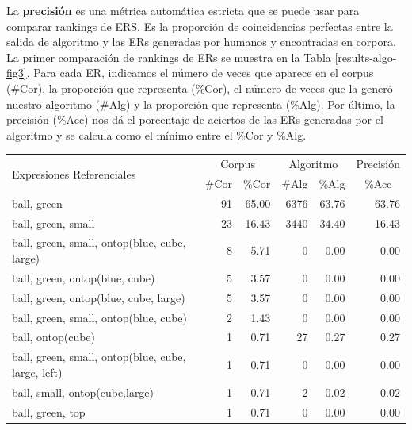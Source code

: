 \begin{table}[H]
La \textbf{precisi\'on}  es una m\'etrica autom\'atica estricta que se puede usar para comparar rankings de ERS. Es la proporci\'on de coincidencias perfectas entre la salida de algoritmo y las ERs generadas por humanos y encontradas en corpora. 
La primer comparaci\'on de rankings de ERs se muestra en la Tabla \ref{results-algo-fig3}. Para cada ER, indicamos el n\'umero de veces que aparece en el corpus (\#Cor), la proporci\'on que representa (\%Cor), el n\'umero de veces que la gener\'o nuestro algoritmo (\#Alg) y la proporci\'on que representa (\%Alg).
Por \'ultimo, la precisi\'on (\%Acc) nos d\'a el porcentaje de aciertos de las ERs generadas por el algoritmo y se calcula como el m\'inimo entre el \%Cor y \%Alg. 

\begin{table}[H]
\begin{small}
\begin{center}
\begin{tabular}{|l|r|r|r|r|r|}
\hline
\multirow{2}{*}{Expresiones Referenciales} & \multicolumn{2}{|c|}{Corpus} & \multicolumn{2}{|c|}{Algoritmo} & Precisi\'on \\ \cline{2-6} 
 & \#Cor & \multicolumn{1}{|c|}{\%Cor} & \multicolumn{1}{|c|}{\#Alg} & \multicolumn{1}{|c|}{\%Alg} & \multicolumn{1}{|c|}{\%Acc} \\
\hline
ball, green                                    & 91 & 65.00 & 6376 & 63.76 & 63.76 \\
ball, green, small                              & 23 & 16.43 & 3440 & 34.40 & 16.43 \\
ball, green, small, ontop(blue, cube, large)      &  8 &  5.71 &    0 &  0.00 &  0.00\\
ball, green, ontop(blue, cube)                  &  5 &  3.57 &    0 &  0.00 &  0.00\\
ball, green, ontop(blue, cube, large)            &  5 &  3.57 &    0 &  0.00 &  0.00\\
ball, green, small, ontop(blue, cube)            &  2 &  1.43 &    0 &  0.00 &  0.00\\
ball, ontop(cube)                             &  1 &  0.71 &   27 &  0.27 &  0.27 \\
ball, green, small, ontop(blue, cube, large, left) &  1 &  0.71 &    0 &  0.00 &  0.00\\
ball, small, ontop(cube,large)	              &  1 &  0.71 &    2 &  0.02 &  0.02 \\
ball, green, top                                &  1 &  0.71 &    0 &  0.00 &  0.00\\

\end{tabular}
\end{center}
\end{small}
\end{table}
\end{table}
